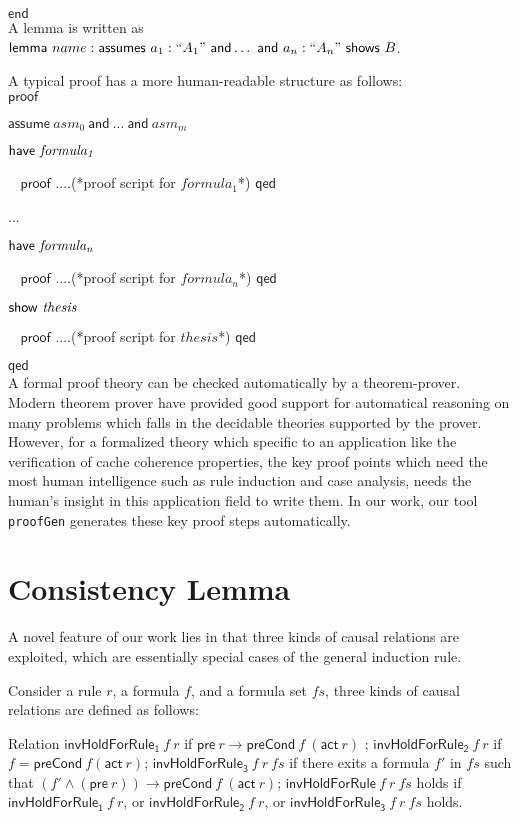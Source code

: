 \documentclass{llncs}
\begin{document}
$\mathsf{end}$ \\
A lemma is written as $\mathsf{lemma}~name:
\mathsf{assumes}~a_{1}:``A_{1}"~{\sf and} \dots~{\sf and}~a_{n}:
``A_{n}"~\mathsf{shows}~B$.


A typical proof  has a more human-readable structure as follows: \\

$\mathsf{proof}$

$\mathsf{assume}~asm_{0}~\mathsf{and}~\ldots~\mathsf{and}~asm_{m}$

$\mathsf{have}~{\it formula_{1}}$

$~~~~\mathsf{proof}$ ....(*proof script for $formula_{1}$*)
$\mathsf{qed}$

...

$\mathsf{have}~{\it formula_{n}}$

$~~~~\mathsf{proof}$ ....(*proof script for $formula_{n}$*)
$\mathsf{qed}$

$\mathsf{show}~{\it thesis}$

$~~~~\mathsf{proof}$ ....(*proof script for $thesis$*)
$\mathsf{qed}$

$\mathsf{qed}$\\

A formal proof theory can be checked automatically by a
theorem-prover. Modern theorem prover have provided good support for
automatical reasoning on many problems which falls in the decidable
theories supported by the prover. However, for a  formalized theory
 which specific to an application like the verification of cache coherence properties,
  the key proof
points which need the most human intelligence such as rule induction
and case analysis, needs the human's insight in this application
field to write them. In our work, our tool {\tt proofGen} generates
these key proof steps automatically.

\section{Consistency Lemma}
A novel feature of our work lies in that three kinds of causal
relations are exploited, which are essentially special cases of the
general induction rule.

 Consider a rule $r$, a formula $f$, and a formula set $fs$, three
 kinds of causal relations are defined as follows:

\begin{definition}  Relation
$\mathsf{invHoldForRule_1} ~f ~r$ if    $ \mathsf{pre}~ r
\longrightarrow \mathsf{preCond}~ f ~(\mathsf{act}~ r)$ ;
$\mathsf{invHoldForRule_2}~ f~ r$ if $f = \mathsf{preCond}~ f
(\mathsf{act}~ r)$; $\mathsf{invHoldForRule_3}~ f~ r ~fs$ if there
exits a formula $f'$ in $fs$ such that
  $(f' \wedge (\mathsf{pre}~ r)) \longrightarrow \mathsf{preCond} ~f ~(\mathsf{act}
  ~r)$; $\mathsf{invHoldForRule}~ f~ r ~fs$ holds if $\mathsf{invHoldForRule_1} ~f
  ~r$, or $\mathsf{invHoldForRule_2} ~f ~r$, or $\mathsf{invHoldForRule_3}~ f~ r
  ~fs$ holds.
\end{definition}
\end{document}
